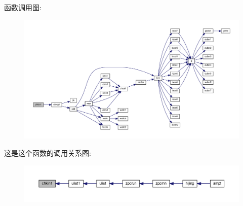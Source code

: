 函数调用图\+:
\nopagebreak
\begin{figure}[H]
\begin{center}
\leavevmode
\includegraphics[width=350pt]{chkin1_8f90_a62d15a7364fc7494ee0e68273be50064_cgraph}
\end{center}
\end{figure}
这是这个函数的调用关系图\+:
\nopagebreak
\begin{figure}[H]
\begin{center}
\leavevmode
\includegraphics[width=350pt]{chkin1_8f90_a62d15a7364fc7494ee0e68273be50064_icgraph}
\end{center}
\end{figure}
